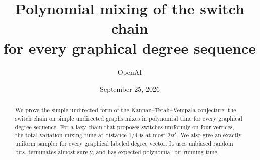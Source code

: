 \documentclass[11pt]{article}
\title{Polynomial mixing of the switch chain\\for every graphical degree sequence}
\author{OpenAI}
\date{September 25, 2026}
\numberwithin{equation}{section}
\theoremstyle{definition}
\theoremstyle{remark}
\begin{document}
\maketitle
\begin{abstract}
We prove the simple-undirected form of the Kannan--Tetali--Vempala
conjecture: the switch chain on simple undirected graphs mixes in polynomial
time for every graphical degree sequence. For a lazy chain that proposes
switches uniformly on four vertices, the total-variation mixing time at
distance $1/4$ is at most $2n^8$.
We also give an exactly uniform sampler for every graphical labeled degree
vector. It uses unbiased random bits, terminates almost surely, and has
expected polynomial bit running time.
\end{abstract}









\end{document}

